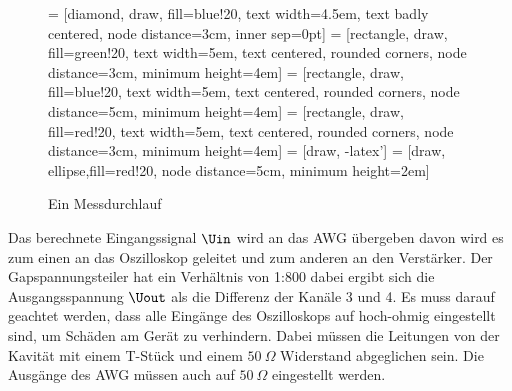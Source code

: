 \documentclass[../Report.tex]{subfiles}
\begin{document}
\begin{figure}[H]
\centering

 = [diamond, draw, fill=blue!20, 
    text width=4.5em, text badly centered, node distance=3cm, inner sep=0pt]
 = [rectangle, draw, fill=green!20, 
    text width=5em, text centered, rounded corners, node distance=3cm, minimum height=4em]
 = [rectangle, draw, fill=blue!20, 
    text width=5em, text centered, rounded corners, node distance=5cm, minimum height=4em]
 = [rectangle, draw, fill=red!20, 
    text width=5em, text centered, rounded corners, node distance=3cm, minimum height=4em]
 = [draw, -latex']
 = [draw, ellipse,fill=red!20, node distance=5cm,
    minimum height=2em]
    
\caption{Ein Messdurchlauf}
  	\label{fig:Messung}
\end{figure}
Das berechnete Eingangssignal $\Uin$ wird an das AWG übergeben davon wird es zum einen an das Oszilloskop geleitet und zum anderen an den Verstärker. Der Gapspannungsteiler hat ein Verhältnis von 1:800 dabei ergibt sich die Ausgangsspannung $\Uout$ als die Differenz der Kanäle 3 und 4. Es muss darauf geachtet werden, dass alle Eingänge des Oszilloskops auf hoch-ohmig eingestellt sind, um Schäden am Gerät zu verhindern. Dabei müssen die Leitungen von der Kavität mit einem T-Stück und einem $\SI{50}{\Omega}$ Widerstand abgeglichen sein. Die Ausgänge des AWG müssen auch auf $\SI{50}{\Omega}$ eingestellt werden.
\end{document}
